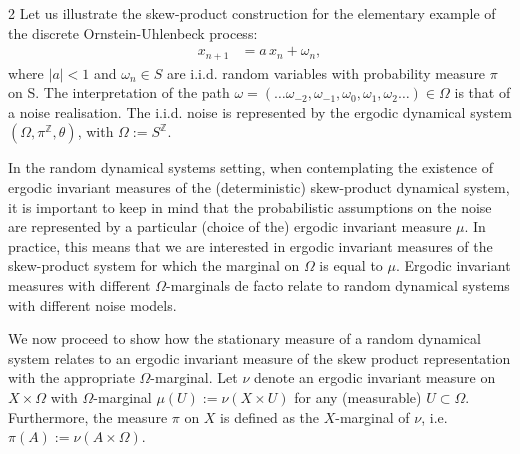 \documentclass[11pt]{article}
\begin{document}
\begin{multicols}{2}
Let us illustrate the skew-product construction for the elementary example of the discrete Ornstein-Uhlenbeck process:
\begin{align}
\label{eq-discrete-OU}
x_{n+1} &= a\,x_n + \omega_{n},
\end{align}
where $\left| a \right| <1$ 
and $\omega_n\in S$ are i.i.d. random variables with probability measure $\pi$ on S.
The interpretation of the path $\omega =  (\ldots \omega_{-2}, \omega_{-1}, \omega_0, \omega_1, \omega_2 \ldots)\in\Omega$ is that of a noise realisation.
The i.i.d. noise is represented by the 
ergodic dynamical system $(\Omega,\pi^\mathbb{Z},\theta)$, with $\Omega:=S^\mathbb{Z}$.


In the random dynamical systems setting, when contemplating the existence of ergodic invariant measures of the (deterministic) skew-product dynamical system, it is important to keep in mind that the probabilistic assumptions on the noise are represented by a particular (choice of the) ergodic invariant measure $\mu$.
In practice, this means that we are interested in ergodic invariant measures of the skew-product system for which the marginal on $\Omega$ is equal to $\mu$. Ergodic invariant measures with different $\Omega$-marginals de facto relate to random dynamical systems with different noise models.

We now proceed to show how the stationary measure of a random dynamical system relates to an ergodic invariant measure of the skew product representation with the appropriate $\Omega$-marginal.
Let $\nu$ denote an ergodic invariant measure on $X\times\Omega$ with $\Omega$-marginal $\mu(U):=\nu(X\times U)$ for any (measurable) $U\subset \Omega$.
Furthermore, the measure $\pi$ on $X$
is defined as the $X$-marginal of $\nu$, i.e.\ $\pi(A):=\nu(A\times\Omega)$.


\end{multicols}
\end{document}
